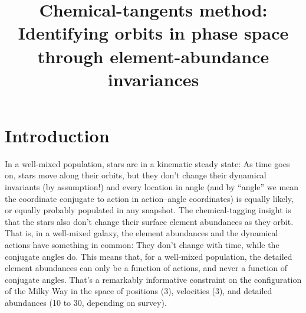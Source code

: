 \documentclass[modern]{aastex63}
\begin{document}
\sloppy\sloppypar\raggedbottom\frenchspacing %
\graphicspath{ {figures/} }

\title{\textbf{%
Chemical-tangents method:\\
Identifying orbits in phase space through element-abundance invariances}}




\begin{abstract}\noindent
\end{abstract}


\section{Introduction}

In a well-mixed population, stars are in a kinematic steady state:
As time goes on, stars move along their orbits, but they don't change their dynamical
invariants (by assumption!) and every location in angle (and by ``angle'' we mean the
coordinate conjugate to action in action--angle coordinates) is equally likely, or
equally probably populated in any snapshot.
The chemical-tagging insight is that the stars also don't change their surface element
abundances as they orbit.
That is, in a well-mixed galaxy, the element abundances and the dynamical actions have
something in common:
They don't change with time, while the conjugate angles do.
This means that, for a well-mixed population, the detailed element abundances can only
be a function of actions, and never a function of conjugate angles.
That's a remarkably informative constraint on the configuration of the Milky Way in
the space of positions (3), velocities (3), and detailed abundances (10 to 30, depending
on survey).
\end{document}
